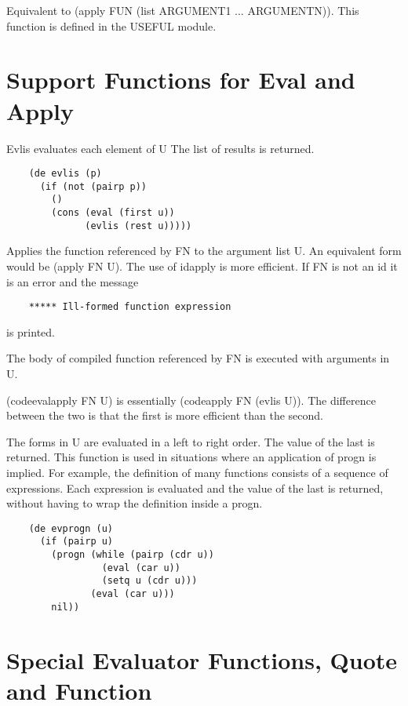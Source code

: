 {    Equivalent  to  (apply  FUN (list ARGUMENT1 ... ARGUMENTN)).
    This function is defined in the USEFUL module.
}
\section{Support Functions for Eval and Apply}

{    Evlis evaluates each element of U  The list  of  results  is
    returned.
}
\begin{verbatim}
    (de evlis (p)
      (if (not (pairp p))
        ()
        (cons (eval (first u))
              (evlis (rest u)))))
\end{verbatim}

{    Applies  the  function referenced by FN to the argument list
    U.  An equivalent form would be (apply FN U).   The  use  of
    idapply  is  more  efficient.    If FN is not an id it is an
    error and the message
}
\begin{verbatim}
    ***** Ill-formed function expression
\end{verbatim}
    is printed.

{    The body of compiled function referenced by FN  is  executed
    with arguments in U.  }

{    (codeevalapply  FN  U)  is  essentially (codeapply FN (evlis
    U)).  The difference between the two is that  the  first  is
    more efficient than the second.  }

{    The  forms in U are evaluated in a left to right order.  The
    value of the last is returned.  This  function  is  used  in
    situations  where  an  application of progn is implied.  For
    example, the definition of  many  functions  consists  of  a
    sequence  of  expressions.  Each expression is evaluated and
    the value of the last is returned, without  having  to  wrap
    the definition inside a progn.}
\begin{verbatim}
    (de evprogn (u)
      (if (pairp u)
        (progn (while (pairp (cdr u))
                 (eval (car u))
                 (setq u (cdr u)))
               (eval (car u)))
        nil))
\end{verbatim}
\section{Special Evaluator Functions, Quote and Function}

